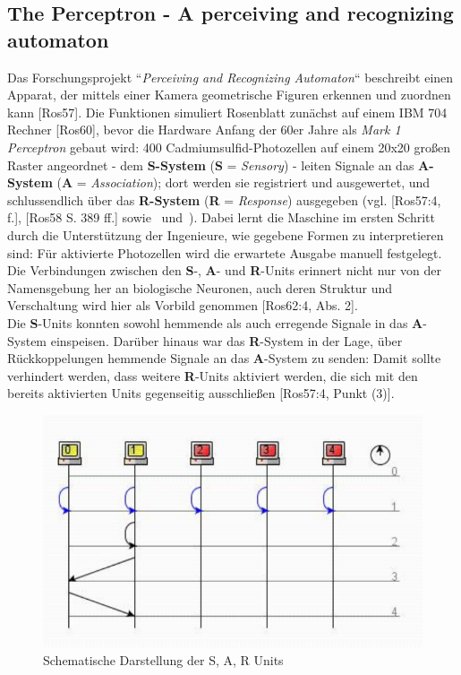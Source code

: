 {\subsection*{The Perceptron - A perceiving and recognizing automaton}
Das Forschungsprojekt ``\textit{Perceiving and Recognizing Automaton}`` beschreibt einen Apparat, der mittels einer Kamera geometrische Figuren erkennen und zuordnen kann [Ros57].
Die Funktionen simuliert Rosenblatt zunächst auf einem IBM 704 Rechner [Ros60], bevor  die Hardware Anfang der 60er Jahre als \textit{Mark 1 Perceptron} gebaut wird: 400 Cadmiumsulfid-Photozellen auf einem 20x20 großen Raster angeordnet - dem \textbf{S-System} (\textbf{S} = \textit{Sensory}) - leiten Signale an das \textbf{A-System} (\textbf{A} = \textit{Association}); dort werden sie registriert und ausgewertet, und schlussendlich über das \textbf{R-System} (\textbf{R} = \textit{Response}) ausgegeben (vgl. [Ros57:4, f.], [Ros58 S. 389 ff.] sowie~\cite[193, ``Frank Rosenblatt]{Bis06} und~\cite[196, Figure 4.8]{Bis06}).
Dabei lernt die Maschine im ersten Schritt durch die Unterstützung der Ingenieure, wie gegebene Formen zu interpretieren sind: Für aktivierte Photozellen wird die erwartete Ausgabe manuell festgelegt.
Die Verbindungen zwischen den \textbf{S}-, \textbf{A}- und \textbf{R}-Units erinnert nicht nur von der Namensgebung her an biologische Neuronen, auch deren Struktur und Verschaltung wird hier als Vorbild genommen [Ros62:4, Abs. 2].\\

Die \textbf{S}-Units konnten sowohl hemmende als auch erregende Signale in das \textbf{A}-System einspeisen. Darüber hinaus war das \textbf{R}-System in der Lage, über Rückkoppelungen hemmende Signale an das \textbf{A}-System zu senden: Damit sollte verhindert werden, dass weitere \textbf{R}-Units aktiviert werden, die sich mit den bereits aktivierten Units gegenseitig ausschließen [Ros57:4, Punkt (3)].



\begin{figure}[h]
    \centering
    \includegraphics{images/p1ReadSeq.pdf}
    \caption{Schematische Darstellung der S, A, R Units}
    \label{fig-sarunits}
\end{figure}


}
